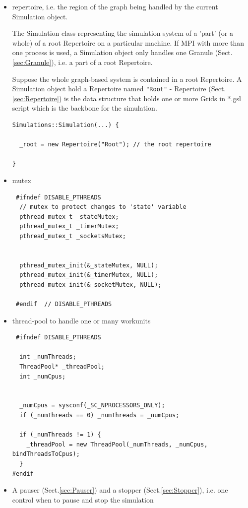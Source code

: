 \begin{itemize}
  
  \item repertoire, i.e. the region of the graph being handled by the current
  Simulation object.
  
The Simulation class representing the simulation system of a 'part' (or a whole)
of a root Repertoire on a particular machine.
If MPI with more than one process is used, a Simulation object only
handles one Granule (Sect.\ref{sec:Granule}), i.e. a part of a root Repertoire. 

Suppose the whole graph-based system is contained in a root
Repertoire. A Simulation object hold a Repertoire named \verb!"Root"! -
Repertoire (Sect.\ref{sec:Repertoire}) is the data structure that holds one or
more Grids in *.gsl script which is the backbone for the simulation.
\begin{verbatim}
Simulations::Simulation(...) {

  _root = new Repertoire("Root"); // the root repertoire
  
}
\end{verbatim}

  \item mutex 

\begin{verbatim}
 #ifndef DISABLE_PTHREADS
  // mutex to protect changes to 'state' variable
  pthread_mutex_t _stateMutex;
  pthread_mutex_t _timerMutex;
  pthread_mutex_t _socketsMutex;


  pthread_mutex_init(&_stateMutex, NULL);
  pthread_mutex_init(&_timerMutex, NULL);
  pthread_mutex_init(&_socketMutex, NULL);
  
 #endif  // DISABLE_PTHREADS
\end{verbatim}

  \item thread-pool to handle one or many workunits
  
\begin{lstlisting}
 #ifndef DISABLE_PTHREADS
 
  int _numThreads;
  ThreadPool* _threadPool;
  int _numCpus;
  
  
  _numCpus = sysconf(_SC_NPROCESSORS_ONLY);
  if (_numThreads == 0) _numThreads = _numCpus;
  
  if (_numThreads != 1) {
    _threadPool = new ThreadPool(_numThreads, _numCpus, bindThreadsToCpus);
  }
#endif 
\end{lstlisting}

  \item A pauser (Sect.\ref{sec:Pauser}) and a stopper (Sect.\ref{sec:Stopper}),
  i.e. one control when to pause and stop the simulation
  

\end{itemize}

